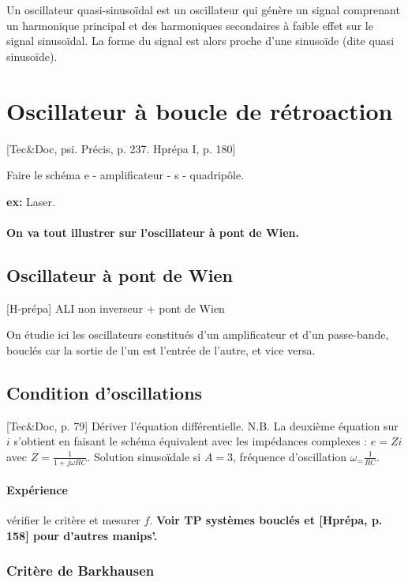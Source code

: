\documentclass[11pt]{report}
\numberwithin{figure}{section}
\numberwithin{equation}{section}
\numberwithin{table}{section}
\newcommand{\1}{\boldsymbol{1}}
\begin{document}
Un oscillateur quasi-sinusoïdal est un oscillateur qui génère un signal comprenant un harmonique principal et des harmoniques secondaires à faible effet sur le signal sinusoïdal. La forme du signal est alors proche d'une sinusoïde (dite quasi sinusoïde).

\section{Oscillateur à boucle de rétroaction}

[Tec\&Doc, psi. Précis, p. 237. Hprépa I, p. 180]

Faire le schéma e - amplificateur - s - quadripôle.


\textbf{ex:} Laser.

\paragraph{On va tout illustrer sur l'oscillateur à pont de Wien.}

\subsection{Oscillateur à pont de Wien}

[H-prépa] ALI non inverseur + pont de Wien

On étudie ici les oscillateurs constitués d'un amplificateur et d'un passe-bande, bouclés car la sortie de l'un est l'entrée de l'autre, et vice versa.

\subsection{Condition d'oscillations} 

[Tec\&Doc, p. 79] Dériver l'équation différentielle. N.B. La deuxième équation sur $i$ s'obtient en faisant le schéma équivalent avec les impédances complexes : $e = Z i$ avec $Z = \frac{1}{1+j\omega RC}$. Solution sinusoïdale si $A = 3$, fréquence d'oscillation $\omega_ = \frac{1}{RC}$.

\paragraph{Expérience} vérifier le critère et mesurer $f$.
\textbf{Voir TP systèmes bouclés et [Hprépa, p. 158] pour d'autres manips'.}

\subsubsection{Critère de Barkhausen}
\end{document}

